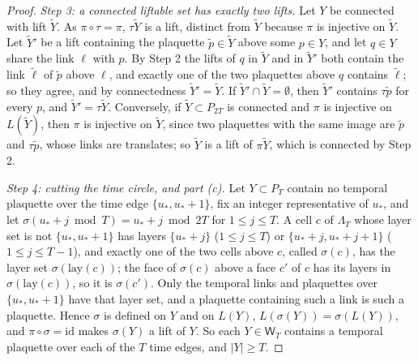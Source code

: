 \documentclass[11pt,a4paper]{amsart}
\theoremstyle{definition}
\theoremstyle{remark}
\numberwithin{equation}{section}
\newcommand{\abs}[1]{\lvert #1\rvert}      %
\begin{document}
\begin{proof}
\emph{Step 3: a connected liftable set has exactly two lifts.} Let $Y$ be connected with lift $\tilde Y$. As $\pi\circ\tau=\pi$, $\tau\tilde Y$ is a lift, distinct from $\tilde Y$ because $\pi$ is injective on $\tilde Y$. Let $\tilde Y'$ be a lift containing the plaquette $\tilde p\in\tilde Y$ above some $p\in Y$, and let $q\in Y$ share the link $\ell$ with $p$. By Step 2 the lifts of $q$ in $\tilde Y$ and in $\tilde Y'$ both contain the link $\tilde\ell$ of $\tilde p$ above $\ell$, and exactly one of the two plaquettes above $q$ contains $\tilde\ell$; so they agree, and by connectedness $\tilde Y'=\tilde Y$. If $\tilde Y'\cap\tilde Y=\emptyset$, then $\tilde Y'$ contains $\tau\tilde p$ for every $p$, and $\tilde Y'=\tau\tilde Y$. Conversely, if $\tilde Y\subset P_{2T}$ is connected and $\pi$ is injective on $L(\tilde Y)$, then $\pi$ is injective on $\tilde Y$, since two plaquettes with the same image are $\tilde p$ and $\tau\tilde p$, whose links are translates; so $\tilde Y$ is a lift of $\pi\tilde Y$, which is connected by Step 2.

\emph{Step 4: cutting the time circle, and part (c).} Let $Y\subset P_T$ contain no temporal plaquette over the time edge $\{u_*,u_*+1\}$, fix an integer representative of $u_*$, and let $\sigma(u_*+j\bmod T)=u_*+j\bmod2T$ for $1\le j\le T$. A cell $c$ of $\Lambda_T$ whose layer set is not $\{u_*,u_*+1\}$ has layers $\{u_*+j\}$ ($1\le j\le T$) or $\{u_*+j,u_*+j+1\}$ ($1\le j\le T-1$), and exactly one of the two cells above $c$, called $\sigma(c)$, has the layer set $\sigma(\mathrm{lay}(c))$; the face of $\sigma(c)$ above a face $c'$ of $c$ has its layers in $\sigma(\mathrm{lay}(c))$, so it is $\sigma(c')$. Only the temporal links and plaquettes over $\{u_*,u_*+1\}$ have that layer set, and a plaquette containing such a link is such a plaquette. Hence $\sigma$ is defined on $Y$ and on $L(Y)$, $L(\sigma(Y))=\sigma(L(Y))$, and $\pi\circ\sigma=\mathrm{id}$ makes $\sigma(Y)$ a lift of $Y$. So each $Y\in\mathsf W_T$ contains a temporal plaquette over each of the $T$ time edges, and $\abs{Y}\ge T$.


\end{proof}
\end{document}
